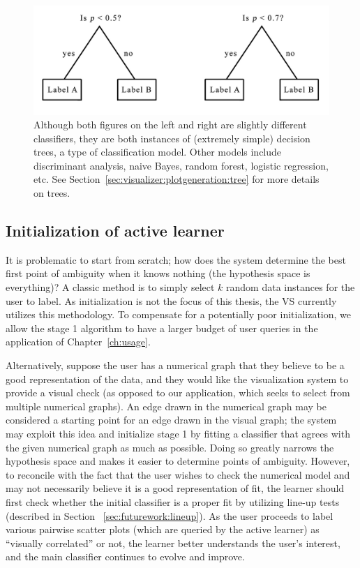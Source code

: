 \begin{figure}[htb]
	\begin{center}
		\includegraphics[width=0.75\linewidth]{ch-visualizer/figures/tree}
		\caption[Classifiers and classification models]{Although both figures 
		on the left and right are slightly different classifiers, they 
		are both instances of (extremely simple) decision trees, a type of 
		classification model. Other models include discriminant analysis, naive 
		Bayes, random forest, logistic regression, etc. 
		See Section~\ref{sec:visualizer:plotgeneration:tree} for more details 
		on trees.}
		\label{fig:visualizer:al:tree}
	\end{center}
\end{figure}

\subsection{Initialization of active learner}
\label{sec:visualizer:al:initialization}

It is problematic to start from scratch; how does the system determine
the best first point of ambiguity when it knows nothing (the hypothesis space is
everything)? A classic method is to simply select $k$ random data instances for 
the user to label. As initialization is not the focus of this thesis, the VS 
currently utilizes this methodology. To compensate for a potentially poor 
initialization, we allow the stage 1 algorithm to have a larger budget of user 
queries in the application of Chapter~\ref{ch:usage}.

Alternatively, suppose the user has a numerical graph that they believe to be a 
good representation of the data, and they would like the visualization system to
provide a visual check (as opposed to our application, which seeks to select 
from multiple numerical graphs). An edge drawn in the numerical graph may 
be considered a starting point for an edge drawn in the visual graph; the 
system may exploit this idea and initialize stage 1 by fitting a classifier 
that agrees with the given numerical graph as much as possible. 
Doing so greatly narrows the hypothesis space and makes it easier
to determine points of ambiguity. However, to reconcile with the fact that the
user wishes to check the numerical model and may not necessarily believe it is a
good representation of fit, the learner should first check whether the initial 
classifier is a proper fit by utilizing line-up tests (described in Section 
~\ref{sec:futurework:lineup}). As the user proceeds to 
label various pairwise scatter plots (which are queried by the active learner) 
as ``visually correlated'' or not, the learner better understands the
user's interest, and the main classifier continues to evolve and improve.

